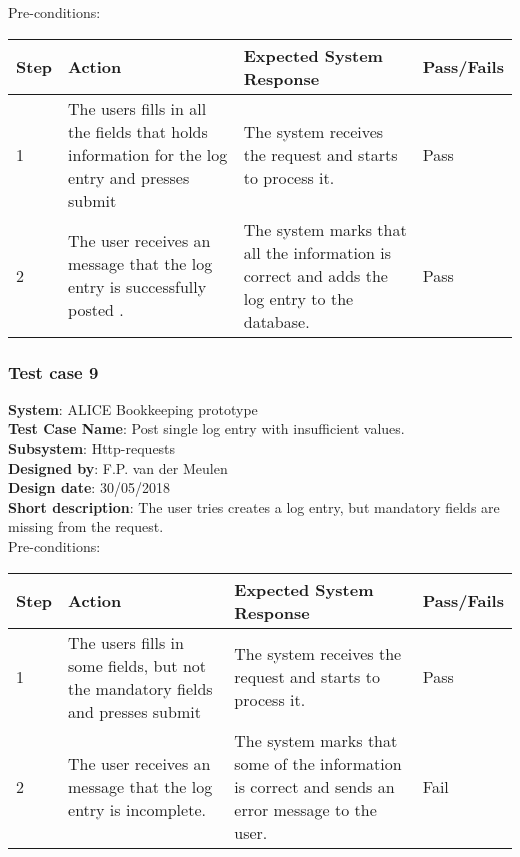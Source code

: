 Pre-conditions: \\

\begin{longtable}{ | p{0.8cm} | p{4.5cm} | p{6cm} | p{1.5cm} |}
\hline
Step & Action & Expected System Response & Pass/Fails  \\ \hline
1 & The users fills in all the fields that holds information for the log entry and presses submit & The system receives the request and starts to process it. & Pass \\ \hline
2 & The user receives an message that the log entry is successfully posted . & The system marks that all the information is correct and adds the log entry to the database. & Pass \\ \hline
\end{longtable}
\subsubsection{Test case 9}
\textbf{System}:  ALICE Bookkeeping prototype \\
\textbf{Test Case Name}:  Post single log entry with insufficient values. \\
\textbf{Subsystem}:  Http-requests \\
\textbf{Designed by}:  F.P. van der Meulen\\
\textbf{Design date}:  30/05/2018\\
\textbf{Short description}: The user tries creates a log entry, but mandatory fields are missing from the request. \\

Pre-conditions: \\

\begin{longtable}{ | p{0.8cm} | p{4.5cm} | p{6cm} | p{1.5cm} |}
\hline
Step & Action & Expected System Response & Pass/Fails  \\ \hline
1 & The users fills in some fields, but not the mandatory fields and presses submit & The system receives the request and starts to process it. & Pass \\ \hline
2 & The user receives an message that the log entry is incomplete. & The system marks that some of the information is correct and sends an error message to the user. & Fail \\ \hline
\end{longtable}

